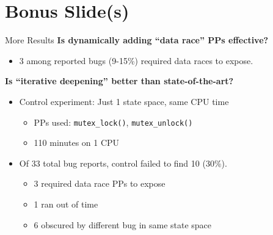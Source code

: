 \documentclass[xcolor=dvipsnames]{beamer}
\begin{document}
\section{Bonus Slide(s)}

\begin{frame}{More Results}
	\textbf{Is dynamically adding ``data race'' PPs effective?}
	\begin{itemize}
		\item 3 among reported bugs (9-15\%) required data races to expose.
	\end{itemize}
	\linegap

	{\bf Is ``iterative deepening'' better than state-of-the-art?}
	\begin{itemize}
		\item Control experiment: Just 1 state space, same CPU time
		\begin{itemize}
			\item PPs used: \texttt{mutex\_lock()}, \texttt{mutex\_unlock()}
			\item 110 minutes on 1 CPU
		\end{itemize}
		\item Of 33 total bug reports, control failed to find 10 (30\%).
		\begin{itemize}
			\item 3 required data race PPs to expose
			\item 1 ran out of time
			\item 6 obscured by different bug in same state space
		\end{itemize}
	\end{itemize}
\end{frame}
\end{document}
